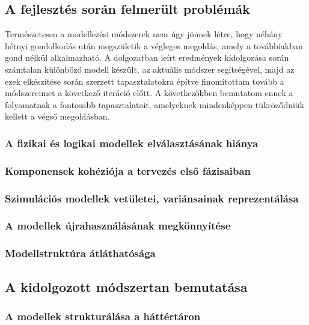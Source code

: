     \subsection{A fejlesztés során felmerült problémák}
    Természetesen a modellezési módszerek nem úgy jönnek létre, hogy néhány hétnyi gondolkodás után megszületik a végleges megoldás, amely a továbbiakban gond nélkül alkalmazható.
    A dolgozatban leírt eredmények kidolgozása során számtalan különböző modell készült, az aktuális módszer segítségével, majd az ezek elkészítése során szerzett tapasztalatokra építve finomítottam tovább a módszereimet a következő iteráció előtt.
    A következőkben bemutatom ennek a folyamatnak a fontosabb tapasztalatait, amelyeknek mindenképpen tükröződniük kellett a végső megoldásban.

        \subsubsection{A fizikai és logikai modellek elválasztásának hiánya}

        \subsubsection{Komponensek kohéziója a tervezés első fázisaiban}

        \subsubsection{Szimulációs modellek vetületei, variánsainak reprezentálása}

        \subsubsection{A modellek újrahasználásának megkönnyítése}

        \subsubsection{Modellstruktúra átláthatósága}

    \subsection{A kidolgozott módszertan bemutatása}

        \subsubsection{A modellek strukturálása a háttértáron}

